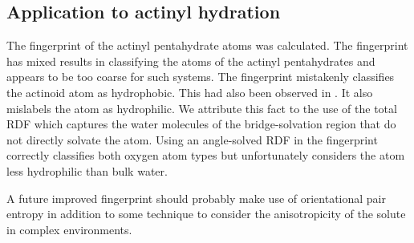 \subsection[Application to actinyl hydration]{Application to actinyl hydration}

 The fingerprint of the actinyl pentahydrate atoms was calculated. The fingerprint has mixed 
results in classifying the atoms of the actinyl pentahydrates and appears to be too coarse for 
such systems. The fingerprint mistakenly classifies the actinoid atom as hydrophobic. This had 
also been observed in . It also mislabels the \oyl atom as hydrophilic. We attribute 
this fact to the use of the total RDF which captures the water molecules of the 
bridge-solvation region that do not directly solvate the \oyl atom. Using an angle-solved RDF 
in the fingerprint correctly classifies both oxygen atom types but unfortunately considers the 
\ofs atom less 
hydrophilic than bulk water. 

A future improved fingerprint should probably make use of orientational pair entropy in 
addition to some technique to consider the anisotropicity of the solute in complex 
environments.




